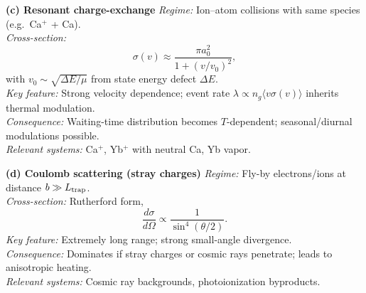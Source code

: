 \medskip
\noindent\textbf{(c) Resonant charge-exchange}\quad
\emph{Regime:} Ion--atom collisions with same species (e.g.\ Ca$^+$ + Ca).\\
\emph{Cross-section:}
\[
\sigma(v) \approx \frac{\pi a_0^2}{1+(v/v_0)^2},
\]
with $v_0\sim \sqrt{\Delta E/\mu}$ from state energy defect $\Delta E$.\\
\emph{Key feature:} Strong velocity dependence; event rate $\lambda\propto n_g\langle v\sigma(v)\rangle$ inherits thermal modulation.\\
\emph{Consequence:} Waiting-time distribution becomes $T$-dependent; seasonal/diurnal modulations possible.\\
\emph{Relevant systems:} Ca$^+$, Yb$^+$ with neutral Ca, Yb vapor.

\medskip
\noindent\textbf{(d) Coulomb scattering (stray charges)}\quad
\emph{Regime:} Fly-by electrons/ions at distance $b\gg L_{\rm trap}$.\\
\emph{Cross-section:} Rutherford form,
\[
\frac{d\sigma}{d\Omega} \propto \frac{1}{\sin^4(\theta/2)}.
\]
\emph{Key feature:} Extremely long range; strong small-angle divergence.\\
\emph{Consequence:} Dominates if stray charges or cosmic rays penetrate; leads to anisotropic heating.\\
\emph{Relevant systems:} Cosmic ray backgrounds, photoionization byproducts.
